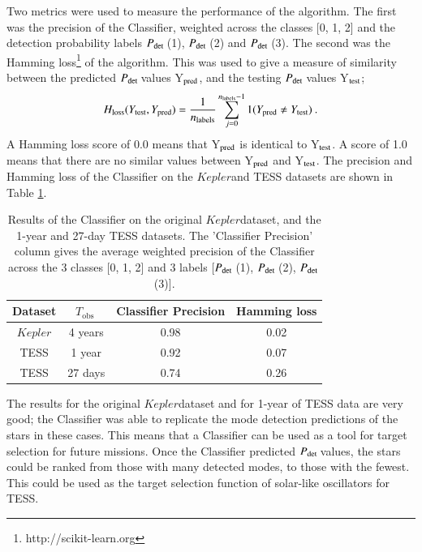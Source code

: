 \documentclass[a4paper,fleqn,usenatbib,useAMS]{mnras}
\newcommand{\kep}{\ensuremath{Kepler}\:}
\newcommand{\pdet}{\ensuremath{P_{\rm det}\:}}
\newcommand{\tobs}{\ensuremath{T_{\textrm{obs}}\:}}
\begin{document}
Two metrics were used to measure the performance of the algorithm. The first was the precision of the Classifier, weighted across the classes [0, 1, 2] and the detection probability labels \pdet(1), \pdet(2) and \pdet(3). The second was the Hamming loss\footnote{http://scikit-learn.org} \citep{wegner_technique_1960} of the algorithm. This was used to give a measure of similarity between the predicted \pdet values Y$_{\rm pred}$, and the testing \pdet values Y$_{\rm test}$;
\begin{equation}
H_{\rm loss}(Y_{\rm test}, Y_{\rm pred}) = \frac{1}{n_{\rm labels}} \sum_{j=0}^{n_{\rm labels}-1} 1(Y_{\rm pred} \neq Y_{\rm test}) \: . 
\end{equation}
A Hamming loss score of 0.0 means that Y$_{\rm pred}$ is identical to Y$_{\rm test}$. A score of 1.0 means that there are no similar values between Y$_{\rm pred}$ and Y$_{\rm test}$. The precision and Hamming loss of the Classifier on the \kep and TESS datasets are shown in Table \ref{tab: results}.
\begin{table}
\begin{center}
\begin{tabular}{ |c|c|c|c| }
Dataset & \tobs   & Classifier Precision & Hamming loss \\
\hline
\kep    & 4 years & 0.98                 & 0.02         \\
TESS    & 1 year  & 0.92                 & 0.07         \\
TESS    & 27 days & 0.74                 & 0.26         \\
\end{tabular}
\end{center}
\caption{Results of the Classifier on the original \kep dataset, and the 1-year and 27-day TESS datasets. The 'Classifier Precision' column gives the average weighted precision of the Classifier across the 3 classes [0, 1, 2] and 3 labels [\pdet(1), \pdet(2), \pdet(3)].}
\label{tab: results}
\end{table}

The results for the original \kep dataset and for 1-year of TESS data are very good; the Classifier was able to replicate the mode detection predictions of the stars in these cases. This means that a Classifier can be used as a tool for target selection for future missions. Once the Classifier predicted \pdet values, the stars could be ranked from those with many detected modes, to those with the fewest. This could be used as the target selection function of solar-like oscillators for TESS.
\end{document}
